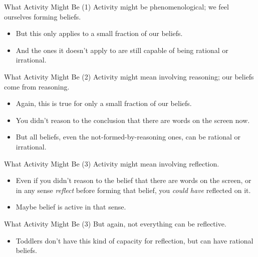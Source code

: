 \documentclass[
  17pt,
  letterpaper,
  ignorenonframetext,
  aspectratio=169,
  xcolor={dvipsnames}]{beamer}
\providecommand{\tightlist}{%
  \setlength{\itemsep}{0pt}\setlength{\parskip}{0pt}}\usepackage{longtable,booktabs,array}
\begin{document}
\begin{frame}{What Activity Might Be (1)}
\protect\hypertarget{what-activity-might-be-1}{}
Activity might be phenomenological; we feel ourselves forming beliefs.

\begin{itemize}[<+->]
\tightlist
\item
  But this only applies to a small fraction of our beliefs.
\item
  And the ones it doesn't apply to are still capable of being rational
  or irrational.
\end{itemize}
\end{frame}

\begin{frame}{What Activity Might Be (2)}
\protect\hypertarget{what-activity-might-be-2}{}
Activity might mean involving reasoning; our beliefs come from
reasoning.

\begin{itemize}[<+->]
\tightlist
\item
  Again, this is true for only a small fraction of our beliefs.
\item
  You didn't reason to the conclusion that there are words on the screen
  now.
\item
  But all beliefs, even the not-formed-by-reasoning ones, can be
  rational or irrational.
\end{itemize}
\end{frame}

\begin{frame}{What Activity Might Be (3)}
\protect\hypertarget{what-activity-might-be-3}{}
Activity might mean involving reflection.

\begin{itemize}[<+->]
\tightlist
\item
  Even if you didn't reason to the belief that there are words on the
  screen, or in any sense \emph{reflect} before forming that belief, you
  \emph{could have} reflected on it.
\item
  Maybe belief is active in that sense.
\end{itemize}
\end{frame}

\begin{frame}{What Activity Might Be (3)}
\protect\hypertarget{what-activity-might-be-3-1}{}
But again, not everything can be reflective.

\begin{itemize}[<+->]
\tightlist
\item
  Toddlers don't have this kind of capacity for reflection, but can have
  rational beliefs.
\end{itemize}
\end{frame}
\end{document}

